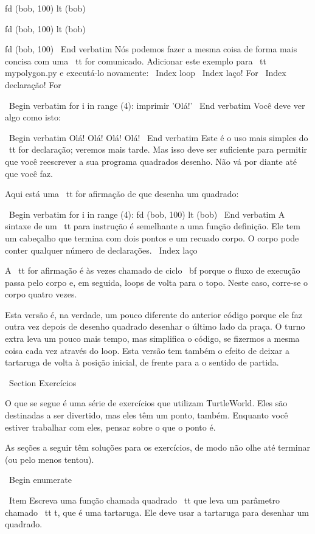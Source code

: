 \documentclass[10pt]{book}
\begin{document}
{fd (bob, 100)
lt (bob)

fd (bob, 100)
lt (bob)

fd (bob, 100)
\ End {verbatim}
%
Nós podemos fazer a mesma coisa de forma mais concisa com uma {\ tt for} comunicado.
Adicionar este exemplo para {\ tt mypolygon.py} e executá-lo novamente:
\ Index {loop}
\ Index {laço! For}
\ Index {declaração! For}

\ Begin {verbatim}
for i in range (4):
    imprimir 'Olá!'
\ End {verbatim}
%
Você deve ver algo como isto:

\ Begin {verbatim}
Olá!
Olá!
Olá!
Olá!
\ End {verbatim}
%
Este é o uso mais simples do {\ tt for} declaração; veremos
mais tarde. Mas isso deve ser suficiente para permitir que você reescrever a sua
programa quadrados desenho. Não vá por diante até que você faz.

Aqui está uma {\ tt for} afirmação de que desenha um quadrado:

\ Begin {verbatim}
for i in range (4):
    fd (bob, 100)
    lt (bob)
\ End {verbatim}
%
A sintaxe de um {\ tt} para instrução é semelhante a uma função
definição. Ele tem um cabeçalho que termina com dois pontos e um recuado
corpo. O corpo pode conter qualquer número de declarações.
\ Index {laço}

A {\ tt for} afirmação é às vezes chamado de ciclo {\ bf} porque
o fluxo de execução passa pelo corpo e, em seguida, loops de volta
para o topo. Neste caso, corre-se o corpo quatro vezes.

Esta versão é, na verdade, um pouco diferente do anterior
código porque ele faz outra vez depois de desenho quadrado
desenhar o último lado da praça. O turno extra leva um pouco
mais tempo, mas simplifica o código, se fizermos a mesma coisa
cada vez através do loop. Esta versão tem também o efeito
de deixar a tartaruga de volta à posição inicial, de frente para a
o sentido de partida.

\ Section {Exercícios}

O que se segue é uma série de exercícios que utilizam TurtleWorld. Eles
são destinadas a ser divertido, mas eles têm um ponto, também. Enquanto você estiver
trabalhar com eles, pensar sobre o que o ponto é.

As seções a seguir têm soluções para os exercícios, de modo
não olhe até terminar (ou pelo menos tentou).

\ Begin {enumerate}

\ Item Escreva uma função chamada {quadrado \ tt} que leva um parâmetro
chamado {\ tt t}, que é uma tartaruga. Ele deve usar a tartaruga para desenhar
um quadrado.

}
\end{document}

